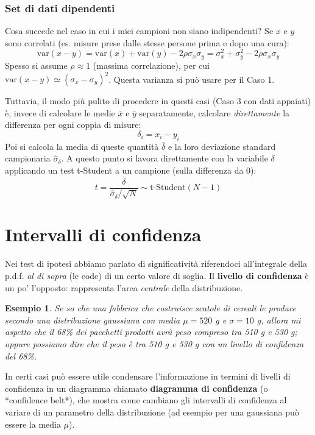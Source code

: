 \documentclass[openany,a4paper,12pt]{book}
\newtheorem{esempio}{Esempio}
\theoremstyle{remark}
\begin{document}
\subsubsection*{Set di dati dipendenti}
Cosa succede nel caso in cui i miei campioni non siano indipendenti? Se $x$ e $y$ sono correlati (es. misure prese dalle stesse persone prima e dopo una cura):
$$ \text{var}(x-y) = \text{var}(x) + \text{var}(y) - 2\rho \sigma_x \sigma_y = \sigma_x^2 + \sigma_y^2 - 2\rho \sigma_x \sigma_y $$
Spesso si assume $\rho \approx 1$ (massima correlazione), per cui $\text{var}(x-y) \simeq (\sigma_x - \sigma_y)^2$. Questa varianza si può usare per il Caso 1.

Tuttavia, il modo più pulito di procedere in questi casi (Caso 3 con dati appaiati) è, invece di calcolare le medie $\bar{x}$ e $\bar{y}$ separatamente, calcolare \textit{direttamente} la differenza per ogni coppia di misure:
$$ \delta_i = x_i - y_i $$
Poi si calcola la media di queste quantità $\bar{\delta}$ e la loro deviazione standard campionaria $\hat{\sigma}_\delta$. A questo punto si lavora direttamente con la variabile $\delta$ applicando un test t-Student a un campione (sulla differenza da 0):
$$ t = \frac{\bar{\delta}}{\hat{\sigma}_\delta / \sqrt{N}} \sim \text{t-Student}(N-1) $$

\section*{Intervalli di confidenza}
Nei test di ipotesi abbiamo parlato di significatività riferendoci all'integrale della p.d.f. \textit{al di sopra} (le code) di un certo valore di soglia.
Il \textbf{livello di confidenza} è un po' l'opposto: rappresenta l'area \textit{centrale} della distribuzione.


\begin{esempio}
Se so che una fabbrica che costruisce scatole di cereali le produce secondo una distribuzione gaussiana con media $\mu = 520$ g e $\sigma = 10$ g, allora mi aspetto che il 68\% dei pacchetti prodotti avrà peso compreso tra 510 g e 530 g; oppure possiamo dire che il peso è tra 510 g e 530 g \textit{con un livello di confidenza del 68\%}.
\end{esempio}

In certi casi può essere utile condensare l'informazione in termini di livelli di confidenza in un diagramma chiamato \textbf{diagramma di confidenza} (o *confidence belt*), che mostra come cambiano gli intervalli di confidenza al variare di un parametro della distribuzione (ad esempio per una gaussiana può essere la media $\mu$).
\end{document}
